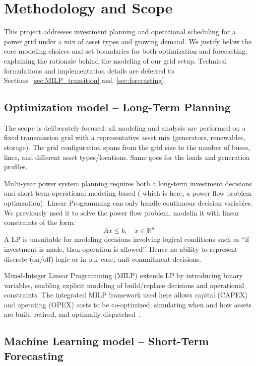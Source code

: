 \newpage
\section{Methodology and Scope}
\label{sec:method_scope}

This project addresses investment planning and operational scheduling for a power grid under a mix of 
asset types and growing demand. We justify below the core modeling choices and set boundaries 
for both optimization and forecasting, explaining the rationale behind the modeling of our grid setup. 
Technical formulations and implementation details are deferred to Sections~\ref{sec:MILP_transition} 
and~\ref{sec:forecasting}.

\subsection{Optimization model -- Long-Term Planning}
The scope is deliberately focused: all modeling and analysis are performed on a fixed transmission 
grid with a representative asset mix (generators, renewables, storage). The grid configuration spans
from the grid size to the number of buses, lines, and different asset types/locations. Same goes for 
the loads and generation profiles.

Multi-year power system planning requires both a long-term investment decisions and short-term 
operational modeling based ( which is here, a power flow problem optimzation). Linear Programming can only 
handle continuous decision variables. We previously used it to solve the power flow problem, modelin it with 
linear constraints of the form:
\[
Ax \leq b, \quad x \in \mathbb{R}^n
\]
A LP is unsuitable for modeling decisions involving logical conditions such as “if investment is made, 
then operation is allowed”. Hence no ability to represent discrete (on/off) logic or in our case, 
unit-commitment decisions. 

Mixed-Integer Linear Programming (MILP) extends LP by introducing binary variables, enabling explicit 
modeling of build/replace decisions and operational constraints. The integrated MILP framework used 
here allows capital (CAPEX) and operating (OPEX) costs to be co-optimized, simulating when and how 
assets are built, retired, and optimally dispatched~\cite{andersson2004power, wood2013power}.


\subsection{Machine Learning model -- Short-Term Forecasting}

